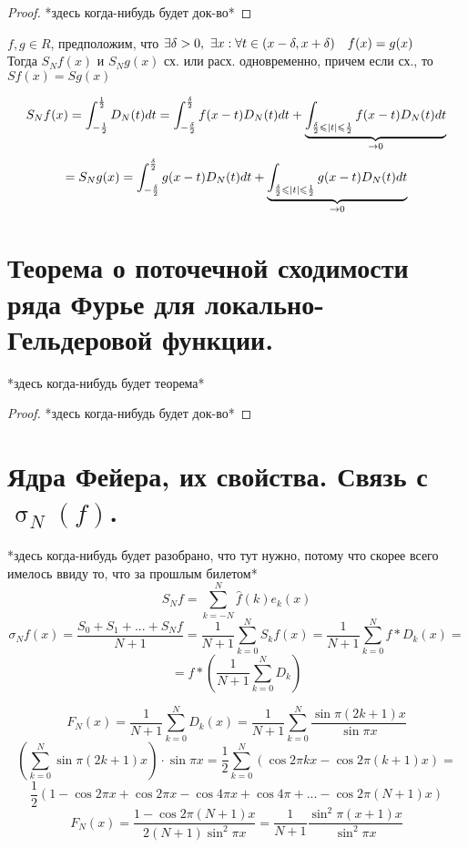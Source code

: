 \documentclass[matan]{subfiles}
\begin{document}
  \begin{proof}
    *здесь когда-нибудь будет док-во*
  \end{proof}

  \begin{theorem}
    $f,g \in R$, предположим, что $\e \delta > 0,\ \e x:  \forall t \in (x-\delta, x + \delta) \q f(x) = g(x)$\\
    Тогда $S_N f(x)$ и $S_N g(x)$ сх. или расх. одновременно, причем если сх., то $S f(x) = S g(x)$
  \end{theorem}

  \begin{Proof}
    \[S_N f(x) = \int_{-\frac{1}{2}}^{\frac{1}{2}} D_N(t) dt =
    \int_{-\frac{\delta}{2}}^{\frac{\delta}{2}} f(x-t) D_N (t) dt + \ub{\ra 0}{\int_{\frac{\delta}{2} \leq |t| \leq \frac{1}{2}} f(x-t) D_N(t) dt}\]
    \[= S_N g(x) = \int_{-\frac{\delta}{2}}^{\frac{\delta}{2}} g(x-t) D_N (t) dt + \ub{\ra 0}{\int_{\frac{\delta}{2} \leq |t| \leq \frac{1}{2}} g(x-t) D_N(t) dt}\]
  \end{Proof}

  \newpage
  \section{Теорема о поточечной сходимости ряда Фурье для локально-Гельдеровой функции.}
  \begin{theorem}
    *здесь когда-нибудь будет теорема*
  \end{theorem}

  \begin{proof}
    *здесь когда-нибудь будет док-во*
  \end{proof}

  \newpage
  \section{Ядра Фейера, их свойства. Связь с $\upsigma_N(f)$.}
  *здесь когда-нибудь будет разобрано, что тут нужно, потому что скорее всего имелось ввиду то, что за прошлым билетом*
  \[S_N f = \sum_{k = -N}^N \hat{f}(k)e_k(x) \]
  \[\sigma_N f(x) = \frac{S_0 + S_1 + ... + S_N f}{N + 1} = \frac{1}{N + 1}
  \sum_{k = 0}^N S_k f(x) = \frac{1}{N + 1} \sum_{k = 0}^N f * D_k(x) = \]
  \[= f * (\frac{1}{N  + 1}\sum_{k = 0}^N D_k)\]

  \begin{Definition} 
      \[F_N(x) = \frac{1}{N  + 1} \sum_{k = 0}^N D_k (x) = \frac{1}{N + 1}
      \sum_{k = 0}^N \frac{\sin \pi (2k + 1)x}{\sin \pi x} \]
      \[(\sum_{k = 0}^N \sin \pi (2k + 1)x) \cdot \sin \pi x = \frac{1}{2}
      \sum_{k = 0}^N (\cos 2\pi kx - \cos 2\pi (k + 1)x) =  \]
      \[\frac{1}{2} ( 1 - \cos 2\pi x + \cos 2\pi x - \cos 4\pi x + \cos 4 \pi + ... -
      \cos 2\pi (N + 1)x)\]
      \[F_N(x) = \frac{1 - \cos 2\pi(N + 1)x}{2(N + 1)\sin^2 \pi x} =
      \frac{1}{N + 1} \frac{\sin^2 \pi (x + 1)x}{\sin^2 \pi x}\]
  \end{Definition}
\end{document}
